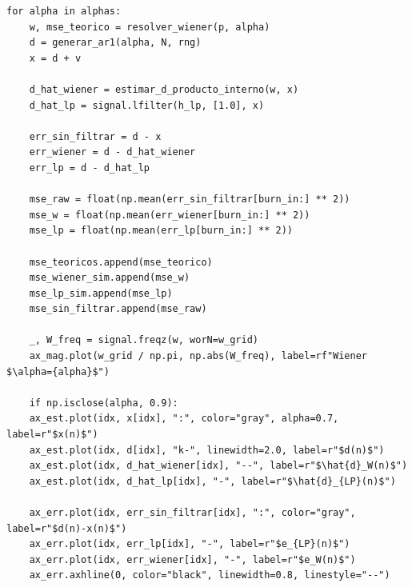 \documentclass[a4paper]{article}
\begin{document}
 \begin{lstlisting}[caption={Bucle de evaluación para distintos valores de \texttt{alpha}.}, label={lst:main_loop}]
 	for alpha in alphas:
 	w, mse_teorico = resolver_wiener(p, alpha)
 	d = generar_ar1(alpha, N, rng)
 	x = d + v
 	
 	d_hat_wiener = estimar_d_producto_interno(w, x)
 	d_hat_lp = signal.lfilter(h_lp, [1.0], x)
 	
 	err_sin_filtrar = d - x
 	err_wiener = d - d_hat_wiener
 	err_lp = d - d_hat_lp
 	
 	mse_raw = float(np.mean(err_sin_filtrar[burn_in:] ** 2))
 	mse_w = float(np.mean(err_wiener[burn_in:] ** 2))
 	mse_lp = float(np.mean(err_lp[burn_in:] ** 2))
 	
 	mse_teoricos.append(mse_teorico)
 	mse_wiener_sim.append(mse_w)
 	mse_lp_sim.append(mse_lp)
 	mse_sin_filtrar.append(mse_raw)
 	
 	_, W_freq = signal.freqz(w, worN=w_grid)
 	ax_mag.plot(w_grid / np.pi, np.abs(W_freq), label=rf"Wiener $\alpha={alpha}$")
 	
 	if np.isclose(alpha, 0.9):
 	ax_est.plot(idx, x[idx], ":", color="gray", alpha=0.7, label=r"$x(n)$")
 	ax_est.plot(idx, d[idx], "k-", linewidth=2.0, label=r"$d(n)$")
 	ax_est.plot(idx, d_hat_wiener[idx], "--", label=r"$\hat{d}_W(n)$")
 	ax_est.plot(idx, d_hat_lp[idx], "-", label=r"$\hat{d}_{LP}(n)$")
 	
 	ax_err.plot(idx, err_sin_filtrar[idx], ":", color="gray", label=r"$d(n)-x(n)$")
 	ax_err.plot(idx, err_lp[idx], "-", label=r"$e_{LP}(n)$")
 	ax_err.plot(idx, err_wiener[idx], "-", label=r"$e_W(n)$")
 	ax_err.axhline(0, color="black", linewidth=0.8, linestyle="--")
 \end{lstlisting}
 
\end{document}
